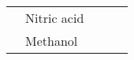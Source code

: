 \begin{table}[]
\begin{tabular}{@{}lllll@{}}
                                                                                                 & Nitric acid                                                                                           &                                                                                                      &                                                                                              &                                                                                                                                                                                                                                                                                                                                                                                                                                                                                                                                                                                                                                                                                                                                                                                                                                                                                                                           \\
                                                                                                 & Methanol                                                                                              &                                                                                                      &                                                                                              &                                                                                                                                                                                                                                                                                                                                                                                                                                                                                                                                                                                                                                                                                                                                                                                                                                                                                                                           \\

\end{tabular}
\end{table}

